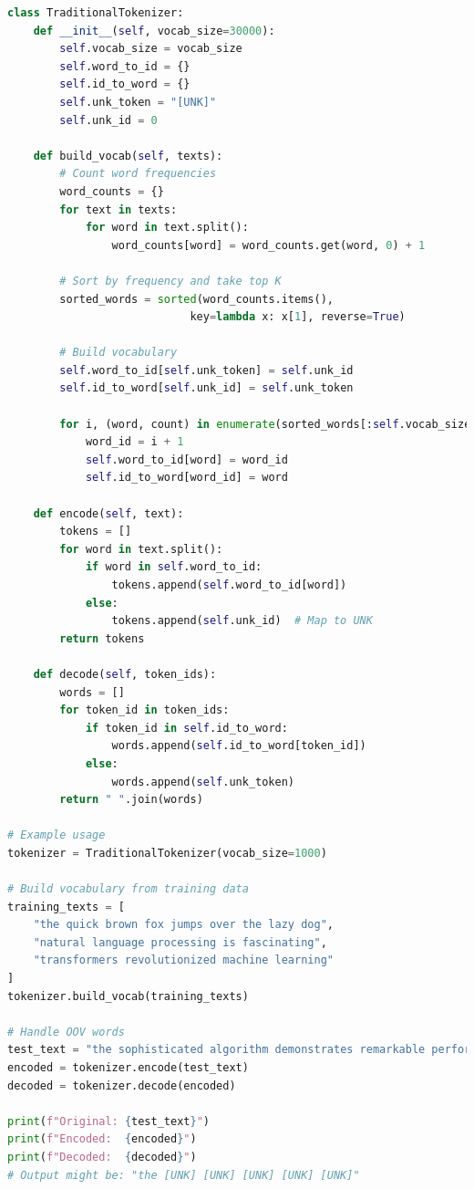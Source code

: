 \begin{example}
\begin{lstlisting}[language=Python]
class TraditionalTokenizer:
    def __init__(self, vocab_size=30000):
        self.vocab_size = vocab_size
        self.word_to_id = {}
        self.id_to_word = {}
        self.unk_token = "[UNK]"
        self.unk_id = 0
        
    def build_vocab(self, texts):
        # Count word frequencies
        word_counts = {}
        for text in texts:
            for word in text.split():
                word_counts[word] = word_counts.get(word, 0) + 1
        
        # Sort by frequency and take top K
        sorted_words = sorted(word_counts.items(), 
                            key=lambda x: x[1], reverse=True)
        
        # Build vocabulary
        self.word_to_id[self.unk_token] = self.unk_id
        self.id_to_word[self.unk_id] = self.unk_token
        
        for i, (word, count) in enumerate(sorted_words[:self.vocab_size-1]):
            word_id = i + 1
            self.word_to_id[word] = word_id
            self.id_to_word[word_id] = word
            
    def encode(self, text):
        tokens = []
        for word in text.split():
            if word in self.word_to_id:
                tokens.append(self.word_to_id[word])
            else:
                tokens.append(self.unk_id)  # Map to UNK
        return tokens
    
    def decode(self, token_ids):
        words = []
        for token_id in token_ids:
            if token_id in self.id_to_word:
                words.append(self.id_to_word[token_id])
            else:
                words.append(self.unk_token)
        return " ".join(words)

# Example usage
tokenizer = TraditionalTokenizer(vocab_size=1000)

# Build vocabulary from training data
training_texts = [
    "the quick brown fox jumps over the lazy dog",
    "natural language processing is fascinating",
    "transformers revolutionized machine learning"
]
tokenizer.build_vocab(training_texts)

# Handle OOV words
test_text = "the sophisticated algorithm demonstrates remarkable performance"
encoded = tokenizer.encode(test_text)
decoded = tokenizer.decode(encoded)

print(f"Original: {test_text}")
print(f"Encoded:  {encoded}")
print(f"Decoded:  {decoded}")
# Output might be: "the [UNK] [UNK] [UNK] [UNK] [UNK]"
\end{lstlisting}
\end{example}

